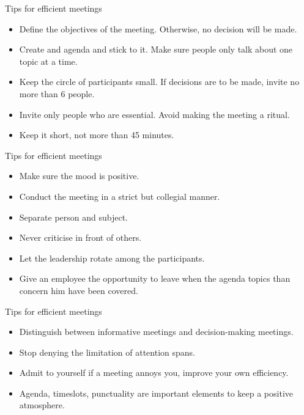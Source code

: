 \documentclass[10pt, UKenglish]{beamer}
\begin{document}
\begin{frame}{Tips for efficient meetings}
  \begin{itemize}
    \item Define the objectives of the meeting. Otherwise, no decision will be made.
    \item Create and agenda and stick to it. Make sure people only talk about one topic at a time.
    \item Keep the circle of participants small. If decisions are to be made, invite no more than 6 people.
    \item Invite only people who are essential. Avoid making the meeting a ritual.
    \item Keep it short, not more than 45 minutes.
  \end{itemize}
\end{frame}


\begin{frame}{Tips for efficient meetings}
  \begin{itemize}
    \item Make sure the mood is positive.
    \item Conduct the meeting in a strict but collegial manner.
    \item Separate person and subject.
    \item Never criticise in front of others.
    \item Let the leadership rotate among the participants.
    \item Give an employee the opportunity to leave when the agenda topics than concern him have been covered.
  \end{itemize}
\end{frame}

\begin{frame}{Tips for efficient meetings}
  \begin{itemize}
    \item Distinguish between informative meetings and decision-making meetings.
    \item Stop denying the limitation of attention spans.
    \item Admit to yourself if a meeting annoys you, improve your own efficiency.
    \item Agenda, timeslots, punctuality are important elements to keep a positive atmosphere.
  \end{itemize}
\end{frame}

%


    
\end{document}
